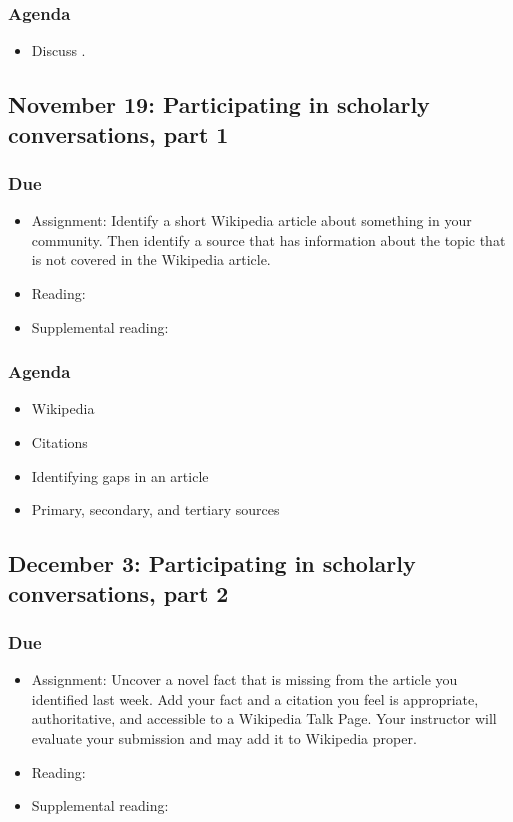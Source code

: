 \documentclass[12pt,article,oneside]{memoir}
\begin{document}
\subsubsection{Agenda}
\begin{itemize}
\item Discuss \cite{guillory2008s}.
\end{itemize}


\subsection{November 19: Participating in scholarly conversations, part 1}
\subsubsection{Due}
\begin{itemize}
 \item Assignment: Identify a short Wikipedia article about something in your community.  Then identify a source that has information about the topic that is not covered in the Wikipedia article.
 \item Reading: \cite{eval}
 \item Supplemental reading: \cite{training}
\end{itemize}

\subsubsection{Agenda}
\begin{itemize}
\item Wikipedia
\item Citations
\item Identifying gaps in an article
\item Primary, secondary, and tertiary sources
\end{itemize}

\subsection{December 3: Participating in scholarly conversations, part 2}
\subsubsection{Due}
\begin{itemize}
 \item Assignment: Uncover a novel fact that is missing from the article you identified last week.  Add your fact and a citation you feel is appropriate, authoritative, and accessible to a Wikipedia Talk Page.  Your instructor will evaluate your submission and may add it to Wikipedia proper.
 \item Reading: \cite{eryk}
 \item Supplemental reading: \cite{doyle}
\end{itemize}
\end{document}
